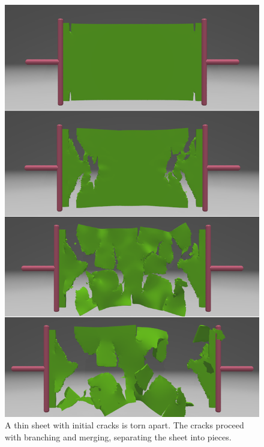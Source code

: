 \begin{figure}[t]
  \centering
  \includegraphics[width=\linewidth]{../figs/revision/demo_tear_thin_sheet.png}
  \caption{\label{fig:16}
  A thin sheet with initial cracks is torn apart. The cracks proceed with branching and merging, separating the sheet into pieces.
}
\end{figure}
